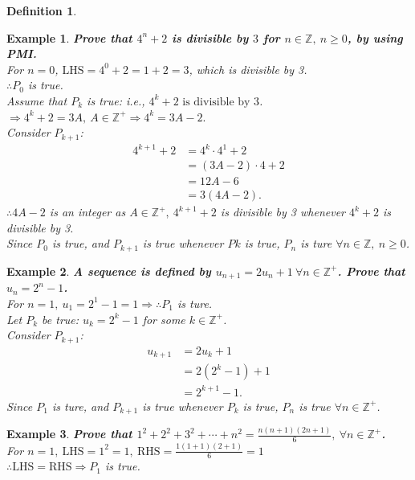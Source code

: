 \documentclass[12pt, a4paper]{article}
\newtheorem{definition}{Definition}[subsection]
\newtheorem{example}{Example}[subsection]
\begin{document}
\begin{enumerate}
\begin{definition}
  \end{definition}
  \begin{example}
    \textbf{Prove that $4^n+2$ is divisible by $3$ for $n \in \mathbb{Z},\ n\geq 0$, by using PMI.}\\
    For $n=0$, $\text{LHS}=4^0+2=1+2=3$, which is divisible by 3. \\
    $\therefore P_0$ {\color{green}{(OR denoted as $P(0)$)}} is true. \\
    Assume that $P_k$ is true: i.e., $4^k+2\text{ is divisible by }3$. $\Rightarrow 4^k+2=3A,\ A \in \mathbb{Z}^+ \Rightarrow 4^k=3A-2.$\\
    Consider $P_{k+1}$: 
    $$\begin{aligned}4^{k+1}+2&=4^k\cdot 4^1+2\\
      &=(3A-2)\cdot 4+2\\
      &=12A-6\\
      &=3(4A-2).
    \end{aligned}$$
    $\therefore 4A-2$ is an integer as $A \in \mathbb{Z}^+,\ 4^{k+1}+2$ is divisible by 3 whenever $4^k+2$ is divisible by 3. \\
    Since $P_0$ is true, and $P_{k+1}$ is true whenever $P{k}$ is true, $P_n$ is ture $\forall n \in \mathbb{Z},\ n \geq 0$.
  \end{example}
  \begin{example}
    \textbf{A sequence is defined by $u_{n+1}=2u_n+1\ \forall n \in \mathbb{Z}^+$. Prove that $u_n=2^n-1$.}\\
    For $n=1,\ u_1=2^1-1=1\Rightarrow \therefore P_1$ is ture.\\
    Let $P_k$ be true: $u_k=2^k-1$ for some $k\in\mathbb{Z}^+$.\\
    Consider $P_{k+1}$: 
    $$\begin{aligned}
      u_{k+1}&=2u_k+1\\
      &=2(2^k-1)+1\\
      &=2^{k+1}-1.
    \end{aligned}$$
    Since $P_1$ is ture, and $P_{k+1}$ is true whenever $P_k$ is true, $P_n$ is true $\forall n\in\mathbb{Z}^+$.
  \end{example}
  \begin{example}
    \textbf{Prove that $1^2+2^2+3^2+\cdots+n^2=\frac{n(n+1)(2n+1)}{6},\ \forall n \in \mathbb{Z}^+$.}\\
    For $n=1,\ \text{LHS}=1^2=1,\ \text{RHS}=\frac{1(1+1)(2+1)}{6}=1$\\
    $\therefore \text{LHS}=\text{RHS} \Rightarrow P_1$ is true. \\

\end{example}
\end{enumerate}
\end{document}
